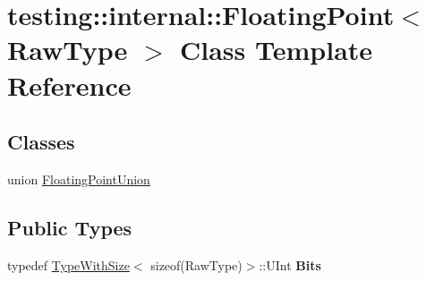 \hypertarget{classtesting_1_1internal_1_1_floating_point}{}\section{testing\+:\+:internal\+:\+:Floating\+Point$<$ Raw\+Type $>$ Class Template Reference}
\label{classtesting_1_1internal_1_1_floating_point}
\subsection*{Classes}
\begin{DoxyCompactItemize}
\item 
union \hyperlink{uniontesting_1_1internal_1_1_floating_point_1_1_floating_point_union}{Floating\+Point\+Union}
\end{DoxyCompactItemize}
\subsection*{Public Types}
\begin{DoxyCompactItemize}
\item 
\mbox{\label{classtesting_1_1internal_1_1_floating_point_abf228bf6cd48f12c8b44c85b4971a731}} 
typedef \hyperlink{classtesting_1_1internal_1_1_type_with_size}{Type\+With\+Size}$<$ sizeof(Raw\+Type)$>$\+::U\+Int {\bfseries Bits}
\end{DoxyCompactItemize}
